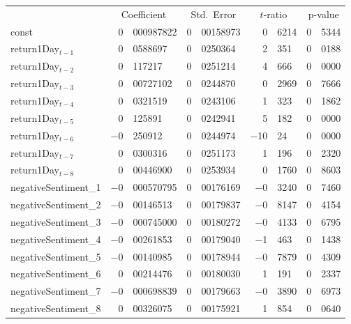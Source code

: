 \begin{center}
\begin{tabular}{lr@{.}lr@{.}lr@{.}lr@{.}l}
    &
    \multicolumn{2}{c}{Coefficient} &
    \multicolumn{2}{c}{Std.\ Error} &
    \multicolumn{2}{c}{$t$-ratio} &
    \multicolumn{2}{c}{p-value} \\[1ex]
const &
    0&000987822 &
    0&00158973 &
        0&6214 &
        0&5344 \\
return1Day$_{t-1}$ &
    0&0588697 &
    0&0250364 &
        2&351 &
        0&0188 \\
return1Day$_{t-2}$ &
    0&117217 &
    0&0251214 &
        4&666 &
        0&0000 \\
return1Day$_{t-3}$ &
    0&00727102 &
    0&0244870 &
        0&2969 &
        0&7666 \\
return1Day$_{t-4}$ &
    0&0321519 &
    0&0243106 &
        1&323 &
        0&1862 \\
return1Day$_{t-5}$ &
    0&125891 &
    0&0242941 &
        5&182 &
        0&0000 \\
return1Day$_{t-6}$ &
    $-$0&250912 &
    0&0244974 &
        $-$10&24 &
        0&0000 \\
return1Day$_{t-7}$ &
    0&0300316 &
    0&0251173 &
        1&196 &
        0&2320 \\
return1Day$_{t-8}$ &
    0&00446900 &
    0&0253934 &
        0&1760 &
        0&8603 \\
negativeSentiment\_1 &
    $-$0&000570795 &
    0&00176169 &
        $-$0&3240 &
        0&7460 \\
negativeSentiment\_2 &
    $-$0&00146513 &
    0&00179837 &
        $-$0&8147 &
        0&4154 \\
negativeSentiment\_3 &
    $-$0&000745000 &
    0&00180272 &
        $-$0&4133 &
        0&6795 \\
negativeSentiment\_4 &
    $-$0&00261853 &
    0&00179040 &
        $-$1&463 &
        0&1438 \\
negativeSentiment\_5 &
    $-$0&00140985 &
    0&00178944 &
        $-$0&7879 &
        0&4309 \\
negativeSentiment\_6 &
    0&00214476 &
    0&00180030 &
        1&191 &
        0&2337 \\
negativeSentiment\_7 &
    $-$0&000698839 &
    0&00179663 &
        $-$0&3890 &
        0&6973 \\
negativeSentiment\_8 &
    0&00326075 &
    0&00175921 &
        1&854 &
        0&0640 \\
\end{tabular}


\end{center}
